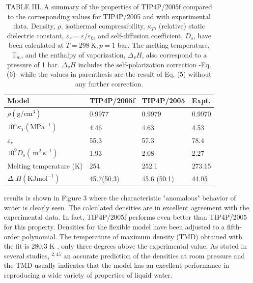 \documentclass[10pt]{article}
\begin{document}
\begin{table}[h]
\begin{center}
\captionsetup{labelformat=empty}
\caption{TABLE III. A summary of the properties of TIP4P/2005f compared to the corresponding values for TIP4P/2005 and with experimental data. Density, $\rho$, isothermal compressibility, $\kappa_{T}$, (relative) static dielectric constant, $\varepsilon_{r}=\varepsilon / \varepsilon_{0}$, and self-diffusion coefficient, $D_{s}$, have been calculated at $T=298 \mathrm{~K}, p =1$ bar. The melting temperature, $\mathrm{T}_{m}$, and the enthalpy of vaporization, $\Delta_{v} H$, also correspond to a pressure of 1 bar. $\Delta_{v} H$ includes the self-polarization correction -Eq. (6)- while the values in parenthesis are the result of Eq. (5) without any further correction.}
\begin{tabular}{|l|l|l|l|}
\hline
Model & TIP4P/2005f & TIP4P/2005 & Expt. \\
\hline
$\rho\left(\mathrm{g} / \mathrm{cm}^{3}\right)$ & 0.9977 & 0.9979 & 0.9970 \\
\hline
$10^{5} \kappa_{T}\left(\mathrm{MPa}^{-1}\right)$ & 4.46 & 4.63 & 4.53 \\
\hline
$\varepsilon_{r}$ & 55.3 & 57.3 & 78.4 \\
\hline
$10^{9} D_{s}\left(\mathrm{~m}^{2} \mathrm{~s}^{-1}\right)$ & 1.93 & 2.08 & 2.27 \\
\hline
Melting temperature (K) & 254 & 252.1 & 273.15 \\
\hline
$\Delta_{v} H\left(\mathrm{KJ} \mathrm{mol}^{-1}\right)$ & 45.7(50.3) & 45.6 (50.1) & 44.05 \\
\hline
\end{tabular}
\end{center}
\end{table}

results is shown in Figure 3 where the characteristic "anomalous" behavior of water is clearly seen. The calculated densities are in excellent agreement with the experimental data. In fact, TIP4P/2005f performs even better than TIP4P/2005 for this property. Densities for the flexible model have been adjusted to a fifth-order polynomial. The temperature of maximum density (TMD) obtained with the fit is 280.3 K , only three degrees above the experimental value. As stated in several studies, ${ }^{2,45}$ an accurate prediction of the densities at room pressure and the TMD usually indicates that the model has an excellent performance in reproducing a wide variety of properties of liquid water.
\end{document}
